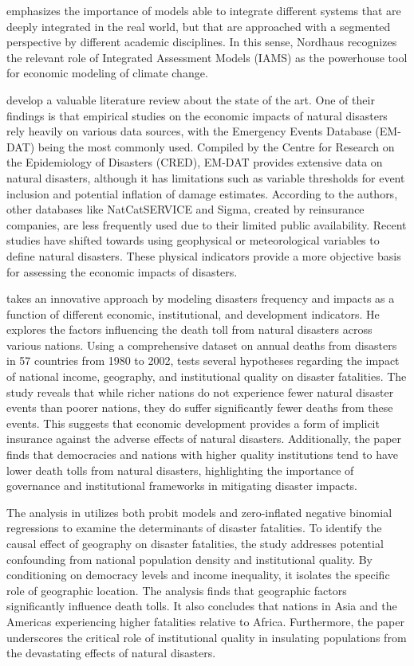 \citet{nordhaus2019climate} emphasizes the importance of models able to integrate different systems that are deeply integrated in the real world, but that are approached with a segmented perspective by different academic disciplines. In this sense, Nordhaus recognizes the relevant role of Integrated Assessment Models (IAMS) as the powerhouse tool for economic modeling of climate change.

\citet{Botzen2019} develop a valuable literature review about the state of the art. One of their findings is that empirical studies on the economic impacts of natural disasters rely heavily on various data sources, with the Emergency Events Database (EM-DAT) \citep{cred_emdat_2024} being the most commonly used. Compiled by the Centre for Research on the Epidemiology of Disasters (CRED), EM-DAT provides extensive data on natural disasters, although it has limitations such as variable thresholds for event inclusion and potential inflation of damage estimates. According to the authors, other databases like NatCatSERVICE and Sigma, created by reinsurance companies, are less frequently used due to their limited public availability. Recent studies have shifted towards using geophysical or meteorological variables to define natural disasters. These physical indicators provide a more objective basis for assessing the economic impacts of disasters.

\citet{Kahn2005} takes an innovative approach by modeling disasters frequency and impacts as a function of different economic, institutional, and development indicators. He explores the factors influencing the death toll from natural disasters across various nations. Using a comprehensive dataset on annual deaths from disasters in 57 countries from 1980 to 2002, \citet{Kahn2005} tests several hypotheses regarding the impact of national income, geography, and institutional quality on disaster fatalities. The study reveals that while richer nations do not experience fewer natural disaster events than poorer nations, they do suffer significantly fewer deaths from these events. This suggests that economic development provides a form of implicit insurance against the adverse effects of natural disasters. Additionally, the paper finds that democracies and nations with higher quality institutions tend to have lower death tolls from natural disasters, highlighting the importance of governance and institutional frameworks in mitigating disaster impacts.

The analysis in \citet{Kahn2005} utilizes both probit models and zero-inflated negative binomial regressions to examine the determinants of disaster fatalities. To identify the causal effect of geography on disaster fatalities, the study addresses potential confounding from national population density and institutional quality. By conditioning on democracy levels and income inequality, it isolates the specific role of geographic location. The analysis finds that geographic factors significantly influence death tolls. It also concludes that nations in Asia and the Americas experiencing higher fatalities relative to Africa. Furthermore, the paper underscores the critical role of institutional quality in insulating populations from the devastating effects of natural disasters.

